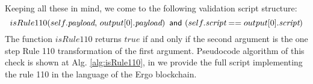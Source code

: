 \documentclass[runningheads]{llncs}
\newcommand{\payload}{\textit{payload}}
\newcommand{\script}{\textit{script}}
\newcommand{\And}{\textsf{ and }}
\def\Let#1#2{\State #1 $\gets$ #2}
\begin{document}
    Keeping all these in mind, we come to the following validation
    script structure:
    \begin{equation}
        \label{eq:script}
        isRule110(self.\payload{},\, output[0].\payload{})\, \And\, \\
        (self.\script{} == output[0].\script{})
    \end{equation}
    The function $isRule110$ returns $true$ if and only if the second argument
    is the one step Rule 110 transformation of the first argument.
    Pseudocode algorithm of this check is shown at Alg. \ref{alg:isRule110}, in
     we provide the full script implementing the rule 110 in
    the language of the Ergo blockchain.

\end{document}
